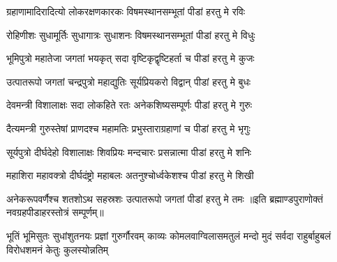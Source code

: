 

\twolineshloka
{ग्रहाणामादिरादित्यो लोकरक्षणकारकः}%
{विषमस्थानसम्भूतां पीडां हरतु मे रविः}%

\twolineshloka
{रोहिणीशः सुधामूर्तिः सुधागात्रः सुधाशनः}%
{विषमस्थानसम्भूतां पीडां हरतु मे विधुः}%

\twolineshloka
{भूमिपुत्रो महातेजा जगतां भयकृत् सदा}%
{वृष्टिकृद्वृष्टिहर्ता च पीडां हरतु मे कुजः}%

\twolineshloka
{उत्पातरूपो जगतां चन्द्रपुत्रो महाद्युतिः}%
{सूर्यप्रियकरो विद्वान् पीडां हरतु मे बुधः}%

\twolineshloka
{देवमन्त्री विशालाक्षः सदा लोकहिते रतः}%
{अनेकशिष्यसम्पूर्णः पीडां हरतु मे गुरुः}%

\twolineshloka
{दैत्यमन्त्री गुरुस्तेषां प्राणदश्च महामतिः}%
{प्रभुस्ताराग्रहाणां च पीडां हरतु मे भृगुः}%

\twolineshloka
{सूर्यपुत्रो दीर्घदेहो विशालाक्षः शिवप्रियः}%
{मन्दचारः प्रसन्नात्मा पीडां हरतु मे शनिः}%

\twolineshloka
{महाशिरा महावक्त्रो दीर्घदंष्ट्रो महाबलः}%
{अतनुश्चोर्ध्वकेशश्च पीडां हरतु मे शिखी}%

\twolineshloka
{अनेकरूपवर्णैश्च शतशोऽथ सहस्रशः}%
{उत्पातरूपो जगतां पीडां हरतु मे तमः}%
॥इति ब्रह्माण्डपुराणोक्तं नवग्रहपीडाहरस्तोत्रं सम्पूर्णम्॥

\closesub

{भूतिं भूमिसुतः सुधांशुतनयः प्रज्ञां गुरुर्गौरवम्}
{काव्यः कोमलवाग्विलासमतुलं मन्दो मुदं सर्वदा}
{राहुर्बाहुबलं विरोधशमनं केतुः कुलस्योन्नतिम्}
